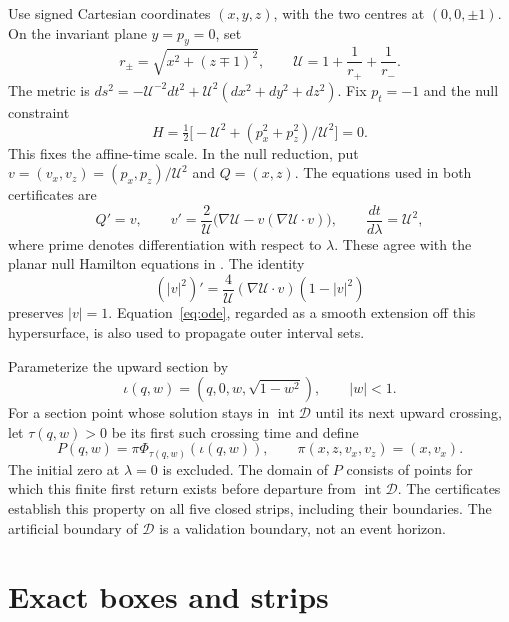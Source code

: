 Use signed Cartesian coordinates $(x,y,z)$, with the two centres at
$(0,0,\pm1)$. On the invariant plane $y=p_y=0$, set
\begin{equation}\label{eq:potential}
 r_\pm=\sqrt{x^2+(z\mp1)^2},\qquad
 \mathcal U=1+\frac1{r_+}+\frac1{r_-}.
\end{equation}
The metric is
$ds^2=-\mathcal U^{-2}dt^2+\mathcal U^2(dx^2+dy^2+dz^2)$.
Fix $p_t=-1$ and the null constraint
\[
 H=\tfrac12\bigl[-\mathcal U^2+(p_x^2+p_z^2)/\mathcal U^2\bigr]=0.
\]
This fixes the affine-time scale. In the null reduction, put
$v=(v_x,v_z)=(p_x,p_z)/\mathcal U^2$ and $Q=(x,z)$. The equations used in both
certificates are
\begin{equation}\label{eq:ode}
 Q'=v,\qquad
 v'=\frac2{\mathcal U}\bigl(\nabla\mathcal U
             -v(\nabla\mathcal U\mathbin{\cdot}v)\bigr),\qquad
 \frac{dt}{d\lambda}=\mathcal U^2,
\end{equation}
where prime denotes differentiation with respect to $\lambda$.
These agree with the planar null Hamilton equations in \cite[Section II.1]{SD}.
The identity
\begin{equation}\label{eq:null}
 (|v|^2)'=\frac4{\mathcal U}(\nabla\mathcal U\mathbin{\cdot}v)(1-|v|^2)
\end{equation}
preserves $|v|=1$. Equation~\eqref{eq:ode}, regarded as a smooth extension off
this hypersurface, is also used to propagate outer interval sets.

Parameterize the upward section by
\begin{equation}\label{eq:section}
 \iota(q,w)=(q,0,w,\sqrt{1-w^2}),\qquad |w|<1.
\end{equation}
For a section point whose solution stays in $\operatorname{int}\mathcal D$
until its next upward crossing, let $\tau(q,w)>0$ be its first such crossing
time and define
\[
 P(q,w)=\pi\Phi_{\tau(q,w)}(\iota(q,w)),\qquad
 \pi(x,z,v_x,v_z)=(x,v_x).
\]
The initial zero at $\lambda=0$ is excluded. The domain of $P$ consists of
points for which this finite first return exists before departure from
$\operatorname{int}\mathcal D$. The certificates establish this property on
all five closed strips, including their boundaries. The artificial boundary
of $\mathcal D$ is a validation boundary, not an event horizon.

\section{Exact boxes and strips}\label{sec:boxes}

